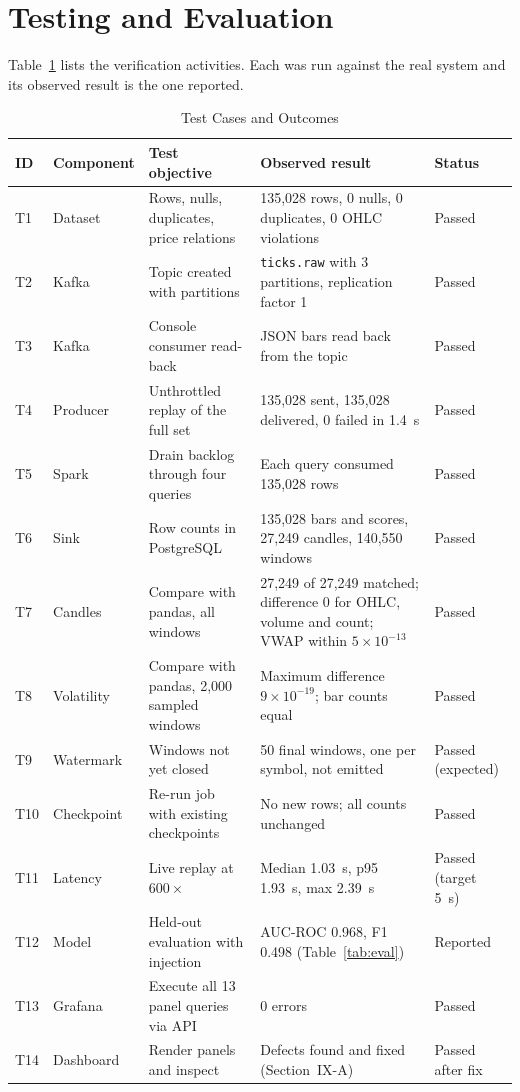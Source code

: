 \documentclass[conference]{IEEEtran}
\newcommand{\code}[1]{\texttt{#1}}
\begin{document}
\section{Testing and Evaluation}

Table~\ref{tab:tests} lists the verification activities. Each was run against the real system and its observed result is the one reported.

\begin{table}[t]
\caption{Test Cases and Outcomes}
\label{tab:tests}
\centering
\small
\begin{tabular}{@{}llp{3.7cm}p{6.8cm}l@{}}
\toprule
ID & Component & Test objective & Observed result & Status \\
\midrule
T1 & Dataset & Rows, nulls, duplicates, price relations & 135,028 rows, 0 nulls, 0 duplicates, 0 OHLC violations & Passed \\
T2 & Kafka & Topic created with partitions & \code{ticks.raw} with 3 partitions, replication factor 1 & Passed \\
T3 & Kafka & Console consumer read-back & JSON bars read back from the topic & Passed \\
T4 & Producer & Unthrottled replay of the full set & 135,028 sent, 135,028 delivered, 0 failed in 1.4~s & Passed \\
T5 & Spark & Drain backlog through four queries & Each query consumed 135,028 rows & Passed \\
T6 & Sink & Row counts in PostgreSQL & 135,028 bars and scores, 27,249 candles, 140,550 windows & Passed \\
T7 & Candles & Compare with pandas, all windows & 27,249 of 27,249 matched; difference 0 for OHLC, volume and count; VWAP within $5\times10^{-13}$ & Passed \\
T8 & Volatility & Compare with pandas, 2,000 sampled windows & Maximum difference $9\times10^{-19}$; bar counts equal & Passed \\
T9 & Watermark & Windows not yet closed & 50 final windows, one per symbol, not emitted & Passed (expected) \\
T10 & Checkpoint & Re-run job with existing checkpoints & No new rows; all counts unchanged & Passed \\
T11 & Latency & Live replay at $600\times$ & Median 1.03~s, p95 1.93~s, max 2.39~s & Passed (target 5~s) \\
T12 & Model & Held-out evaluation with injection & AUC-ROC 0.968, F1 0.498 (Table~\ref{tab:eval}) & Reported \\
T13 & Grafana & Execute all 13 panel queries via API & 0 errors & Passed \\
T14 & Dashboard & Render panels and inspect & Defects found and fixed (Section~IX-A) & Passed after fix \\
\bottomrule
\end{tabular}
\end{table}
\end{document}
